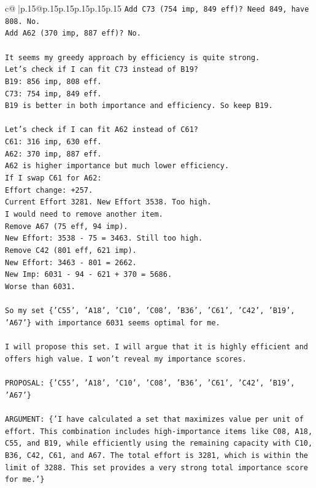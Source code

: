 \documentclass{article}
\begin{document}
{\begin{supertabular}{c@{$\;$}|p{.15\linewidth}@{}p{.15\linewidth}p{.15\linewidth}p{.15\linewidth}p{.15\linewidth}p{.15\linewidth}}
{{{\texttt{Add C73 (754 imp, 849 eff)? Need 849, have 808. No.} \\
\texttt{Add A62 (370 imp, 887 eff)? No.} \\
\\ 
\texttt{It seems my greedy approach by efficiency is quite strong.} \\
\texttt{Let's check if I can fit C73 instead of B19?} \\
\texttt{B19: 856 imp, 808 eff.} \\
\texttt{C73: 754 imp, 849 eff.} \\
\texttt{B19 is better in both importance and efficiency. So keep B19.} \\
\\ 
\texttt{Let's check if I can fit A62 instead of C61?} \\
\texttt{C61: 316 imp, 630 eff.} \\
\texttt{A62: 370 imp, 887 eff.} \\
\texttt{A62 is higher importance but much lower efficiency.} \\
\texttt{If I swap C61 for A62:} \\
\texttt{Effort change: +257.} \\
\texttt{Current Effort 3281. New Effort 3538. Too high.} \\
\texttt{I would need to remove another item.} \\
\texttt{Remove A67 (75 eff, 94 imp).} \\
\texttt{New Effort: 3538 {-} 75 = 3463. Still too high.} \\
\texttt{Remove C42 (801 eff, 621 imp).} \\
\texttt{New Effort: 3463 {-} 801 = 2662.} \\
\texttt{New Imp: 6031 {-} 94 {-} 621 + 370 = 5686.} \\
\texttt{Worse than 6031.} \\
\\ 
\texttt{So my set \{'C55', 'A18', 'C10', 'C08', 'B36', 'C61', 'C42', 'B19', 'A67'\} with importance 6031 seems optimal for me.} \\
\\ 
\texttt{I will propose this set. I will argue that it is highly efficient and offers high value. I won't reveal my importance scores.} \\
\\ 
\texttt{PROPOSAL: \{'C55', 'A18', 'C10', 'C08', 'B36', 'C61', 'C42', 'B19', 'A67'\}} \\
\\ 
\texttt{ARGUMENT: \{'I have calculated a set that maximizes value per unit of effort. This combination includes high{-}importance items like C08, A18, C55, and B19, while efficiently using the remaining capacity with C10, B36, C42, C61, and A67. The total effort is 3281, which is within the limit of 3288. This set provides a very strong total importance score for me.'\}} \\
            }
        }
    }
     \\ \\


\end{supertabular}}
\end{document}
